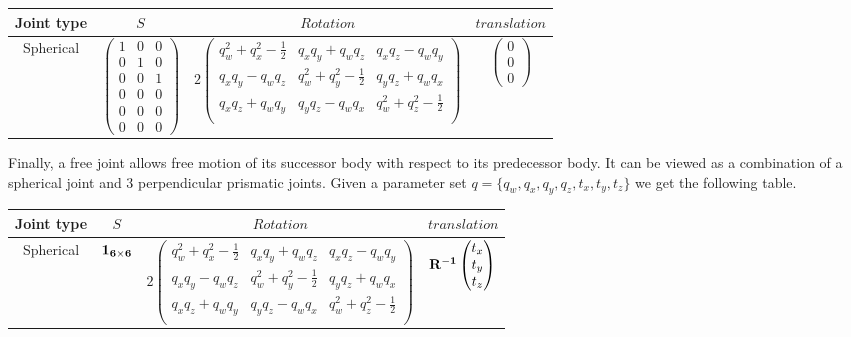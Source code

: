 \begin{tabular}{|c|c|c|c|}
  \hline
  Joint type & $S$ & $Rotation$ & $translation$ \\
  \hline
  Spherical
  &
  $\begin{pmatrix}
    1 & 0 & 0 \\ 0 & 1 & 0 \\ 0 & 0 & 1 \\ 0 & 0 & 0 \\ 0 & 0 & 0 \\ 0 & 0 & 0
  \end{pmatrix}$
  &
  $2 \begin{pmatrix}
    q_w^2 +q_x^2-\frac{1}{2} & q_x q_y + q_w q_z & q_x q_z - q_w q_y \\
    q_x q_y - q_w q_z & q_w^2 +q_y^2-\frac{1}{2} & q_y q_z + q_w q_x \\
    q_x q_z + q_w q_y & q_y q_z - q_w q_x & q_w^2 +q_z^2-\frac{1}{2} \\
  \end{pmatrix}$
  &
  $\begin{pmatrix}
    0 \\ 0 \\ 0
  \end{pmatrix}$
  \\
  \hline
\end{tabular}

Finally, a free joint allows free motion of its successor body with respect to its predecessor body.
It can be viewed as a combination of a spherical joint and 3 perpendicular prismatic joints.
Given a parameter set $q = \{ q_w, q_x, q_y, q_z, t_x, t_y, t_z\}$ we get the following table.

\begin{tabular}{|c|c|c|c|}
  \hline
  Joint type & $S$ & $Rotation$ & $translation$ \\
  \hline
  Spherical
  &
  $\bf{1}_{6\times 6}$
  &
  $2 \begin{pmatrix}
    q_w^2 +q_x^2-\frac{1}{2} & q_x q_y + q_w q_z & q_x q_z - q_w q_y \\
    q_x q_y - q_w q_z & q_w^2 +q_y^2-\frac{1}{2} & q_y q_z + q_w q_x \\
    q_x q_z + q_w q_y & q_y q_z - q_w q_x & q_w^2 +q_z^2-\frac{1}{2} \\
  \end{pmatrix}$
  &
  $\bf{R}^{-1}\begin{pmatrix}
    t_x \\ t_y \\ t_z
  \end{pmatrix}$
  \\
  \hline
\end{tabular}

